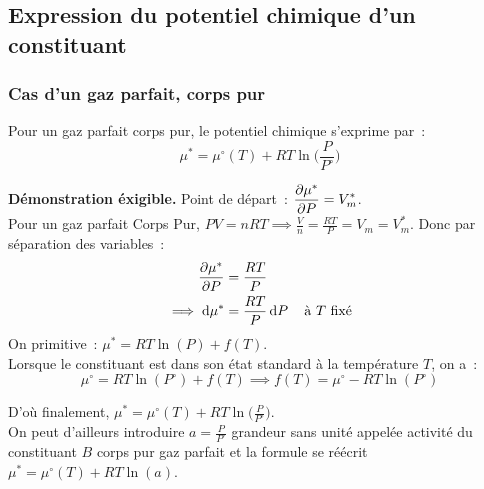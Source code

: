 \documentclass{article}
\newcommand{\ds}{\displaystyle}
\begin{document}
\subsection{Expression du potentiel chimique d'un constituant}
\subsubsection{Cas d'un gaz parfait, corps pur}
\begin{enonce}
    Pour un gaz parfait corps pur, le potentiel chimique s'exprime par~:
    $$\mu^* = \mu^\circ(T) + RT\ln \bigg(\frac{P}{P^\circ}\bigg)$$
\end{enonce}
\begin{tableau}
    \textbf{Démonstration éxigible.} Point de départ~: $\ds \pdv{\mu^*}{P} = V_m^*$.\\
    Pour un gaz parfait Corps Pur, $\ds PV = nRT \implies \frac{V}{n} = \frac{RT}{P} = V_m=V_m^*$. Donc par séparation des variables~:
    \begin{align*}
        \pdv{\mu^*}{P} &= \frac{RT}{P}\\
        \implies \dd{\mu^*} &= \frac{RT}{P}\dd{P}\quad \text{à $T$ fixé}
    \end{align*}
    On primitive~: $\mu^* = RT \ln (P) + f(T)$.\\
    
    Lorsque le constituant est dans son état standard à la température $T$, on a~:
    $$\mu^\circ = RT\ln (P^\circ) + f(T)\implies f(T) = \mu^\circ - RT\ln (P^\circ)$$
    
    D'où finalement, $\mu^* = \mu^\circ(T) + RT\ln \big(\frac{P}{P^\circ}\big)$.\\
    
    On peut d'ailleurs introduire $a=\frac{P}{P^\circ}$ grandeur sans unité appelée activité du constituant $B$ corps pur gaz parfait et la formule se réécrit $\mu^* = \mu^\circ(T) + RT\ln(a)$.
\end{tableau}
\end{document}
